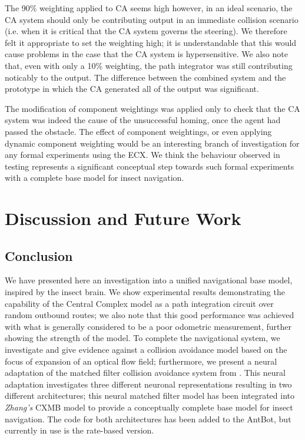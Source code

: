 \documentclass[a4paper,11pt,twoside,openright]{article}
\let\oldsection\section
\def\section{\cleardoublepage\oldsection}
\begin{document}
The 90\% weighting applied to CA seems high however, in an ideal
scenario, the CA system should only be contributing output in an
immediate collision scenario (i.e. when it is critical that the CA
system governs the steering). We therefore felt it appropriate to set
the weighting high; it is understandable that this would cause
problems in the case that the CA system is hypersensitive. We also
note that, even with only a 10\% weighting, the path integrator was still
contributing noticably to the output. The difference between the
combined system and the prototype in which the CA generated all of the
output was significant.
\newline\par

The modification of component weightings was applied only to check
that the CA system was indeed the cause of the unsuccessful homing,
once the agent had passed the obstacle. The effect of component
weightings, or even applying dynamic component weighting would be an
interesting branch of investigation for any formal experiments using
the ECX. We think the behaviour observed in testing represents a
significant conceptual step towards such formal experiments with a
complete base model for insect navigation.
\newpage


\section{ Discussion and Future Work}
\subsection{Conclusion}
We have presented here an investigation into a unified navigational
base model, inspired by the insect brain. We show experimental results
demonstrating the capability of the Central Complex model as a path
integration circuit over random outbound routes; we also note that
this good performance was achieved with what is generally considered
to be a poor odometric measurement, further showing the strength of
the model. To complete the navigational system, we investigate and
give evidence against a collision avoidance model based on the focus
of expansion of an optical flow field; furthermore, we present a
neural adaptation of the matched filter collision avoidance system
from \cite{Mitchell2018}. This neural adaptation investigates three
different neuronal representations resulting in two different
architectures; this neural matched filter model has been integrated
into \textit{Zhang's} CXMB model to provide a conceptually complete
base model for insect navigation. The code for both architectures
has been added to the AntBot, but currently in use is the rate-based
version.\newline\par
\end{document}
